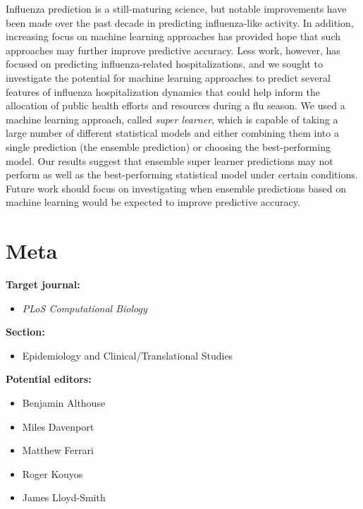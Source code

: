 \documentclass[10pt,letterpaper]{article}
\providecommand{\tightlist}{%
  \setlength{\itemsep}{0pt}\setlength{\parskip}{0pt}}
\begin{document}
Influenza prediction is a still-maturing science, but notable
improvements have been made over the past decade in predicting
influenza-like activity. In addition, increasing focus on machine
learning approaches has provided hope that such approaches may further
improve predictive accuracy. Less work, however, has focused on
predicting influenza-related hospitalizations, and we sought to
investigate the potential for machine learning approaches to predict
several features of influenza hospitalization dynamics that could help
inform the allocation of public health efforts and resources during a
flu season. We used a machine learning approach, called \emph{super
learner}, which is capable of taking a large number of different
statistical models and either combining them into a single prediction
(the ensemble prediction) or choosing the best-performing model. Our
results suggest that ensemble super learner predictions may not perform
as well as the best-performing statistical model under certain
conditions. Future work should focus on investigating when ensemble
predictions based on machine learning would be expected to improve
predictive accuracy.

\hypertarget{meta}{%
\section{Meta}\label{meta}}

\textbf{Target journal:}

\begin{itemize}
\tightlist
\item
  \emph{PLoS Computational Biology}
\end{itemize}

\noindent \textbf{Section:}

\begin{itemize}
\tightlist
\item
  Epidemiology and Clinical/Translational Studies
\end{itemize}

\noindent \textbf{Potential editors:}

\begin{itemize}
\tightlist
\item
  Benjamin Althouse
\item
  Miles Davenport
\item
  Matthew Ferrari
\item
  Roger Kouyos
\item
  James Lloyd-Smith
\end{itemize}
\end{document}
